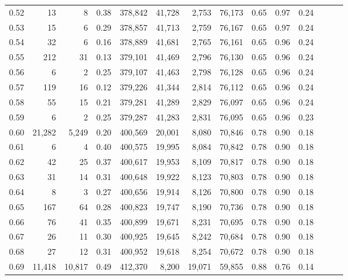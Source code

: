 \begin{tabular}{rrrrrrrrrrrrrr}
0.52 &      13 &       8 &  0.38 &  378,842 &   41,728 &   2,753 &  76,173 &  0.65 &  0.97 &      0.24 \\
0.53 &      15 &       6 &  0.29 &  378,857 &   41,713 &   2,759 &  76,167 &  0.65 &  0.97 &      0.24 \\
0.54 &      32 &       6 &  0.16 &  378,889 &   41,681 &   2,765 &  76,161 &  0.65 &  0.96 &      0.24 \\
0.55 &     212 &      31 &  0.13 &  379,101 &   41,469 &   2,796 &  76,130 &  0.65 &  0.96 &      0.24 \\
0.56 &       6 &       2 &  0.25 &  379,107 &   41,463 &   2,798 &  76,128 &  0.65 &  0.96 &      0.24 \\
0.57 &     119 &      16 &  0.12 &  379,226 &   41,344 &   2,814 &  76,112 &  0.65 &  0.96 &      0.24 \\
0.58 &      55 &      15 &  0.21 &  379,281 &   41,289 &   2,829 &  76,097 &  0.65 &  0.96 &      0.24 \\
0.59 &       6 &       2 &  0.25 &  379,287 &   41,283 &   2,831 &  76,095 &  0.65 &  0.96 &      0.23 \\
0.60 &  21,282 &   5,249 &  0.20 &  400,569 &   20,001 &   8,080 &  70,846 &  0.78 &  0.90 &      0.18 \\
0.61 &       6 &       4 &  0.40 &  400,575 &   19,995 &   8,084 &  70,842 &  0.78 &  0.90 &      0.18 \\
0.62 &      42 &      25 &  0.37 &  400,617 &   19,953 &   8,109 &  70,817 &  0.78 &  0.90 &      0.18 \\
0.63 &      31 &      14 &  0.31 &  400,648 &   19,922 &   8,123 &  70,803 &  0.78 &  0.90 &      0.18 \\
0.64 &       8 &       3 &  0.27 &  400,656 &   19,914 &   8,126 &  70,800 &  0.78 &  0.90 &      0.18 \\
0.65 &     167 &      64 &  0.28 &  400,823 &   19,747 &   8,190 &  70,736 &  0.78 &  0.90 &      0.18 \\
0.66 &      76 &      41 &  0.35 &  400,899 &   19,671 &   8,231 &  70,695 &  0.78 &  0.90 &      0.18 \\
0.67 &      26 &      11 &  0.30 &  400,925 &   19,645 &   8,242 &  70,684 &  0.78 &  0.90 &      0.18 \\
0.68 &      27 &      12 &  0.31 &  400,952 &   19,618 &   8,254 &  70,672 &  0.78 &  0.90 &      0.18 \\
0.69 &  11,418 &  10,817 &  0.49 &  412,370 &    8,200 &  19,071 &  59,855 &  0.88 &  0.76 &      0.14 \\

\end{tabular}
